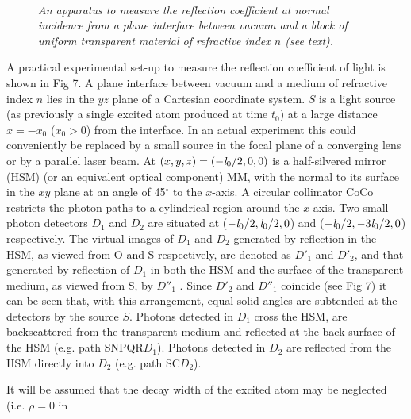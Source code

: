 {  

\begin{figure}[htbp]
\begin{center}
\hspace*{-0.5cm}\mbox{
}
\caption{{\sl An apparatus to measure the reflection coefficient at
 normal incidence from a plane interface between vacuum and a block of uniform
 transparent material of refractive index $n$ (see text).}} 
\label{fig-fig7}
\end{center}
\end{figure}

 A practical experimental set-up to measure the reflection coefficient of light is shown in Fig 7. A plane
 interface between vacuum and a medium of refractive index $n$ lies in the $yz$ plane of a
  Cartesian coordinate system. $S$ is a light source (as previously a single excited atom 
  produced at time $t_0$) at a large distance $x = -x_0$ ($x_0 > 0$) from the interface.
  In an actual experiment this could conveniently be replaced by a small source in the focal plane of a converging
  lens or by a parallel laser beam.
  At $(x,y,z)= (-{\it l}_0/2, 0, 0)$ is a half-silvered mirror (HSM) (or an equivalent optical
  component) MM, with the normal to its surface in the $xy$ plane at an angle of 45$^{\circ}$ to the $x$-axis.
  A circular collimator CoCo  restricts the photon paths to a cylindrical region around the $x$-axis. Two small photon
   detectors $D_1$ and $D_2$ are situated at ($-{\it l}_0/2, {\it l}_0/2, 0$) and
  ($-{\it l}_0/2, -3{\it l}_0/2, 0$) respectively. The virtual images of $D_1$ and $D_2$ generated by 
  reflection in the HSM, as viewed from O and S respectively,
  are denoted as  $D'_1$ and $D'_2$, and that generated by reflection of $D_1$ 
   in both the HSM and the surface of the transparent medium, as viewed from S, by $D''_1$ .
   Since  $D'_2$ and $D''_1$ coincide
    (see Fig 7)  it can be seen that, with this arrangement,
   equal solid angles are subtended at the detectors by the source $S$. Photons detected in
   $D_1$ cross the HSM, are 
   backscattered from the transparent medium and reflected at the back surface of the HSM (e.g. path SNPQR$D_1$).
   Photons detected in  $D_2$ are reflected from the HSM directly into
   $D_2$ (e.g. path SC$D_2$). 
   \par It will be assumed that the decay width of the excited atom may be neglected (i.e. $\rho = 0$ in
}
